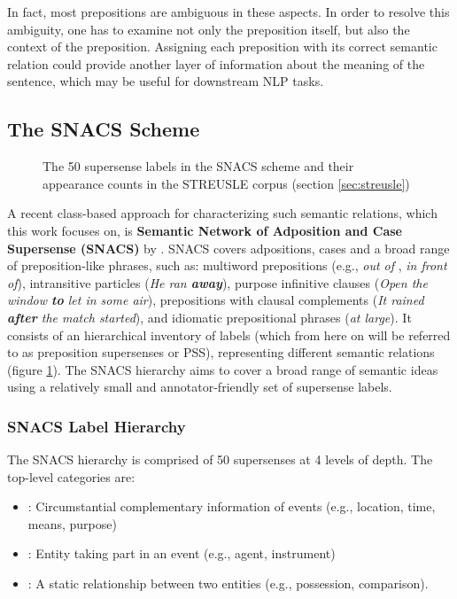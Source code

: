 In fact, most prepositions are ambiguous in these aspects. In order to resolve this ambiguity, one has to examine not only the preposition itself, but also the context of the preposition. Assigning each preposition with its correct semantic relation could provide another layer of information about the meaning of the sentence, which may be useful for downstream NLP tasks.

\subsection{The SNACS Scheme} \label{sec:snacsscheme}

\begin{figure}
    \centering\small
    
    \caption{The 50 supersense labels in the SNACS scheme and their appearance counts in the STREUSLE corpus (section \ref{sec:streusle})}
    \label{fig:snacs}
\end{figure}

A recent class-based approach for characterizing such semantic relations, which this work focuses on, is \textbf{Semantic Network of Adposition and Case Supersense (SNACS)} by \cite{snacs}. SNACS covers adpositions, cases and a broad range of preposition-like phrases, such as: multiword prepositions (e.g., \emph{out of} , \emph{in front of}), intransitive particles (\emph{He ran \textbf{away}}), purpose infinitive clauses (\emph{Open the window \textbf{to} let in some air}), prepositions with clausal complements (\emph{It rained \textbf{after} the match started}), and idiomatic prepositional phrases (\textit{at large}). It consists of an hierarchical inventory of labels (which from here on will be referred to as preposition supersenses or PSS), representing different semantic relations (figure \ref{fig:snacs}). The SNACS hierarchy aims to cover a broad range of semantic ideas using a relatively small and annotator-friendly set of supersense labels.

\subsubsection{SNACS Label Hierarchy}

The SNACS hierarchy is comprised of 50 supersenses at 4 levels of depth. The top-level categories are:
\begin{itemize}
    \item {}:  Circumstantial complementary information of events (e.g., location, time, means, purpose)
    \item {}: Entity taking part in an event (e.g., agent, instrument)
    \item {}: A static relationship between two entities (e.g., possession, comparison).
\end{itemize}

